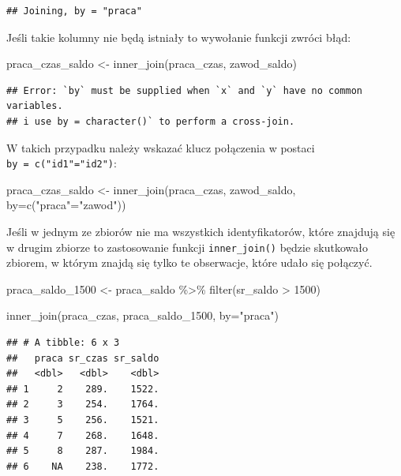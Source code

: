 \documentclass[
]{book}
\newenvironment{Shaded}{\begin{snugshade}}{\end{snugshade}}
\newcommand{\AttributeTok}[1]{\textcolor[rgb]{0.77,0.63,0.00}{#1}}
\newcommand{\DecValTok}[1]{\textcolor[rgb]{0.00,0.00,0.81}{#1}}
\newcommand{\FunctionTok}[1]{\textcolor[rgb]{0.00,0.00,0.00}{#1}}
\newcommand{\NormalTok}[1]{#1}
\newcommand{\OtherTok}[1]{\textcolor[rgb]{0.56,0.35,0.01}{#1}}
\newcommand{\SpecialCharTok}[1]{\textcolor[rgb]{0.00,0.00,0.00}{#1}}
\newcommand{\StringTok}[1]{\textcolor[rgb]{0.31,0.60,0.02}{#1}}
\begin{document}
\begin{verbatim}
## Joining, by = "praca"
\end{verbatim}

Jeśli takie kolumny nie będą istniały to wywołanie funkcji zwróci błąd:

\begin{Shaded}
\begin{Highlighting}[]
\NormalTok{praca\_czas\_saldo }\OtherTok{\textless{}{-}} \FunctionTok{inner\_join}\NormalTok{(praca\_czas, zawod\_saldo)}
\end{Highlighting}
\end{Shaded}

\begin{verbatim}
## Error: `by` must be supplied when `x` and `y` have no common variables.
## i use by = character()` to perform a cross-join.
\end{verbatim}

W takich przypadku należy wskazać klucz połączenia w postaci \texttt{by\ =\ c("id1"="id2")}:

\begin{Shaded}
\begin{Highlighting}[]
\NormalTok{praca\_czas\_saldo }\OtherTok{\textless{}{-}} \FunctionTok{inner\_join}\NormalTok{(praca\_czas, zawod\_saldo, }\AttributeTok{by=}\FunctionTok{c}\NormalTok{(}\StringTok{"praca"}\OtherTok{=}\StringTok{"zawod"}\NormalTok{))}
\end{Highlighting}
\end{Shaded}

Jeśli w jednym ze zbiorów nie ma wszystkich identyfikatorów, które znajdują się w drugim zbiorze to zastosowanie funkcji \texttt{inner\_join()} będzie skutkowało zbiorem, w którym znajdą się tylko te obserwacje, które udało się połączyć.

\begin{Shaded}
\begin{Highlighting}[]
\NormalTok{praca\_saldo\_1500 }\OtherTok{\textless{}{-}}\NormalTok{ praca\_saldo }\SpecialCharTok{\%\textgreater{}\%}
  \FunctionTok{filter}\NormalTok{(sr\_saldo }\SpecialCharTok{\textgreater{}} \DecValTok{1500}\NormalTok{)}

\FunctionTok{inner\_join}\NormalTok{(praca\_czas, praca\_saldo\_1500, }\AttributeTok{by=}\StringTok{"praca"}\NormalTok{)}
\end{Highlighting}
\end{Shaded}

\begin{verbatim}
## # A tibble: 6 x 3
##   praca sr_czas sr_saldo
##   <dbl>   <dbl>    <dbl>
## 1     2    289.    1522.
## 2     3    254.    1764.
## 3     5    256.    1521.
## 4     7    268.    1648.
## 5     8    287.    1984.
## 6    NA    238.    1772.
\end{verbatim}
\end{document}
